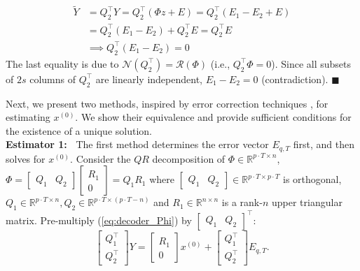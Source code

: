 \documentclass[../../thesis.tex]{subfiles}
\begin{document}
\begin{equation}
\begin{aligned}
	\tilde Y &= Q_2^\top Y =  Q_2^\top (\Phi z+E) =  Q_2^\top (E_1 - E_2 + E  ) \\
	& =  Q_2^\top(E_1-E_2) +  Q_2^\top E =  Q_2^\top E \\
	& \implies  Q_2^\top (E_1-E_2) = 0 \nonumber 
\end{aligned}
\end{equation}
The last equality is due to $\mathcal{N}(Q_2^\top) = \mathcal{R}(\Phi)$ (i.e., $Q_2^\top \Phi = 0$). Since all subsets of $2s$ columns of $Q_2^\top$ are linearly independent, $E_1 - E_2 = 0 $ (contradiction). \hfill$\blacksquare$


Next, we present two methods, inspired by error correction techniques \cite{tao11}\cite{David_Chang}, for estimating $x^{(0)}$. We show their equivalence and provide sufficient conditions for the existence of a unique solution.\\
{\bf Estimator 1:~} The first method determines the error vector $E_{q,T}$ first, and then solves for $x^{(0)}$. 
Consider the $QR$ decomposition \cite{QRdecomp} of $\Phi \in \mathbb{R}^{p\cdot T \times n}$,
$	\Phi = \begin{bmatrix} Q_1 & Q_2 \end{bmatrix} \begin{bmatrix} R_1 \\ 0 \end{bmatrix} = Q_1 R_1 $
where $\begin{bmatrix} Q_1 & Q_2 \end{bmatrix} \in \mathbb{R}^{p\cdot T \times p\cdot T}$ is orthogonal, $Q_1 \in \mathbb{R}^{p\cdot T\times n}, Q_2 \in \mathbb{R}^{p\cdot T \times (p\cdot T-n)}$ and $R_1 \in \mathbb{R}^{n\times n}$ is a rank-$n$ upper triangular matrix. Pre-multiply (\ref{eq:decoder_Phi}) by $\begin{bmatrix} Q_1 & Q_2 \end{bmatrix} ^\top$:
\begin{equation}
	\begin{bmatrix} Q_1 ^\top \\ Q_2 ^\top \end{bmatrix} Y = \begin{bmatrix}R_1 \\ 0  \end{bmatrix} x^{(0)} + \begin{bmatrix} Q_1 ^\top \\ Q_2^\top \end{bmatrix} E_{q,T}.
	\label{eq:QR}
\end{equation}
\end{document}
